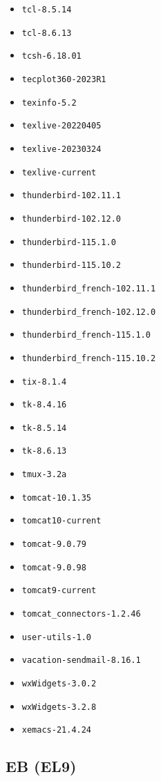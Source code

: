 \begin{multicols}{3}
\begin{itemize}
\item \verb|tcl-8.5.14|
\item \verb|tcl-8.6.13|
\item \verb|tcsh-6.18.01|
\item \verb|tecplot360-2023R1|
\item \verb|texinfo-5.2|
\item \verb|texlive-20220405|
\item \verb|texlive-20230324|
\item \verb|texlive-current|
\item \verb|thunderbird-102.11.1|
\item \verb|thunderbird-102.12.0|
\item \verb|thunderbird-115.1.0|
\item \verb|thunderbird-115.10.2|
\item \verb|thunderbird_french-102.11.1|
\item \verb|thunderbird_french-102.12.0|
\item \verb|thunderbird_french-115.1.0|
\item \verb|thunderbird_french-115.10.2|
\item \verb|tix-8.1.4|
\item \verb|tk-8.4.16|
\item \verb|tk-8.5.14|
\item \verb|tk-8.6.13|
\item \verb|tmux-3.2a|
\item \verb|tomcat-10.1.35|
\item \verb|tomcat10-current|
\item \verb|tomcat-9.0.79|
\item \verb|tomcat-9.0.98|
\item \verb|tomcat9-current|
\item \verb|tomcat_connectors-1.2.46|
\item \verb|user-utils-1.0|
\item \verb|vacation-sendmail-8.16.1|
\item \verb|wxWidgets-3.0.2|
\item \verb|wxWidgets-3.2.8|
\item \verb|xemacs-21.4.24|
\end{itemize}
\end{multicols}
\normalsize

\subsection{EB (EL9)}
\label{sect:software-eb}

